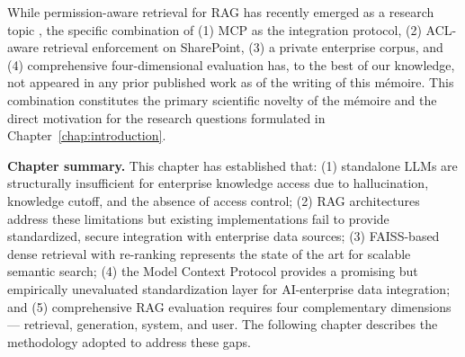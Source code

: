 While permission-aware retrieval for RAG has recently emerged as a research topic \citep{Jeong2025, Chen2025SAC}, the specific combination of (1) MCP as the integration protocol, (2) ACL-aware retrieval enforcement on SharePoint, (3) a private enterprise corpus, and (4) comprehensive four-dimensional evaluation has, to the best of our knowledge, not appeared in any prior published work as of the writing of this mémoire. This combination constitutes the primary scientific novelty of the mémoire and the direct motivation for the research questions formulated in Chapter~\ref{chap:introduction}.

\bigskip

\noindent\textbf{Chapter summary.} This chapter has established that: (1) standalone LLMs are structurally insufficient for enterprise knowledge access due to hallucination, knowledge cutoff, and the absence of access control; (2) RAG architectures address these limitations but existing implementations fail to provide standardized, secure integration with enterprise data sources; (3) FAISS-based dense retrieval with re-ranking represents the state of the art for scalable semantic search; (4) the Model Context Protocol provides a promising but empirically unevaluated standardization layer for AI-enterprise data integration; and (5) comprehensive RAG evaluation requires four complementary dimensions — retrieval, generation, system, and user. The following chapter describes the methodology adopted to address these gaps.
